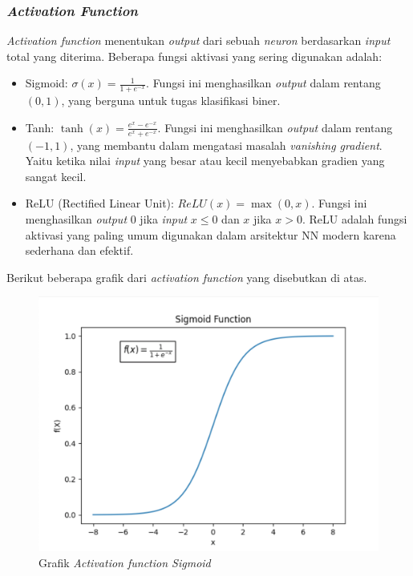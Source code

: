  \subsubsection{\emph{Activation Function}}
 \emph{Activation function} menentukan \emph{output} dari sebuah \emph{neuron} berdasarkan \emph{input} total yang diterima. Beberapa fungsi aktivasi yang sering digunakan adalah:
 \begin{itemize}
   \item Sigmoid: \( \sigma(x) = \frac{1}{1 + e^{-x}} \). Fungsi ini menghasilkan \emph{output} dalam rentang \( (0, 1) \), yang berguna untuk tugas klasifikasi biner.
   \item Tanh: \( \tanh(x) = \frac{e^{x} - e^{-x}}{e^{x} + e^{-x}} \). Fungsi ini menghasilkan \emph{output} dalam rentang \( (-1, 1) \), yang membantu dalam mengatasi masalah \emph{vanishing gradient}. Yaitu ketika nilai \emph{input} yang besar atau kecil menyebabkan gradien yang sangat kecil.
   \item ReLU (Rectified Linear Unit): \( ReLU(x) = \max(0, x) \). Fungsi ini menghasilkan \emph{output} \( 0 \) jika \emph{input} \( x \leq 0 \) dan \( x \) jika \( x > 0 \). ReLU adalah fungsi aktivasi yang paling umum digunakan dalam arsitektur NN modern karena sederhana dan efektif.
 \end{itemize}

 Berikut beberapa grafik dari \emph{activation function} yang disebutkan di atas.

  \begin{figure}[H]
    \centering
    \includegraphics[scale=0.4]{gambar/bab2-grafik-sigmoid.png}
    \caption{Grafik \emph{Activation function Sigmoid}}
    \label{fig:sigmoid_function}
  \end{figure}

